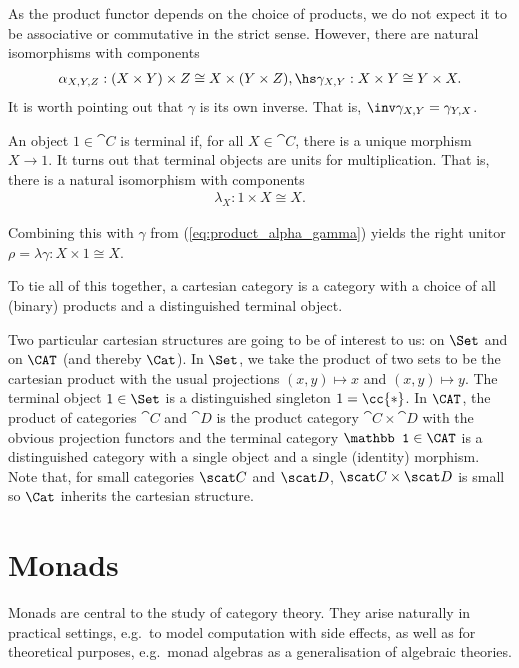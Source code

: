 As the product functor depends on the choice of products, we do not expect it to
be associative or commutative in the strict sense. However, there are natural
isomorphisms with components
\begin{align}\label{eq:product_alpha_gamma}
  \alpha_{X,Y,Z} : (X\times Y)\times Z \cong X\times (Y\times Z), \hs
  \gamma_{X,Y} : X\times Y \cong Y\times X.
\end{align}
It is worth pointing out that $\gamma$ is its own inverse. That is,
$\inv\gamma_{X,Y}=\gamma_{Y,X}$.

An object $1\in\cat{C}$ is terminal if, for all $X\in\cat{C}$, there is a unique
morphism $X\to 1$. It turns out that terminal objects are units for
multiplication. That is, there is a natural isomorphism with components
\begin{align*}
  \lambda_X : 1\times X \cong X.
\end{align*}

Combining this with $\gamma$ from (\ref{eq:product_alpha_gamma}) yields the
right unitor $\rho=\lambda\gamma:X\times 1\cong X$.

To tie all of this together, a cartesian category is a category with a choice of
all (binary) products and a distinguished terminal object.

\begin{example}
  Two particular cartesian structures are going to be of interest to us: on $\Set$
  and on $\CAT$ (and thereby $\Cat$). In $\Set$, we take the product of two sets
  to be the cartesian product with the usual projections $(x,y)\mapsto x$ and
  $(x,y)\mapsto y$. The terminal object $1\in\Set$ is a distinguished singleton
  $1=\cc{*}$. In $\CAT$, the product of categories $\cat{C}$ and $\cat{D}$ is the
  product category $\cat{C}\times\cat{D}$ with the obvious projection functors and
  the terminal category $\mathbb 1\in\CAT$ is a distinguished category with a
  single object and a single (identity) morphism. Note that, for small categories
  $\scat C$ and $\scat D$, $\scat C\times\scat D$ is small so $\Cat$ inherits the
  cartesian structure.
\end{example}

\section{Monads}\label{sec:monads}

Monads are central to the study of category theory. They arise naturally in practical settings,
e.g.\ to model computation with side effects, as well as for theoretical
purposes, e.g.\ monad algebras as a generalisation of algebraic theories.

